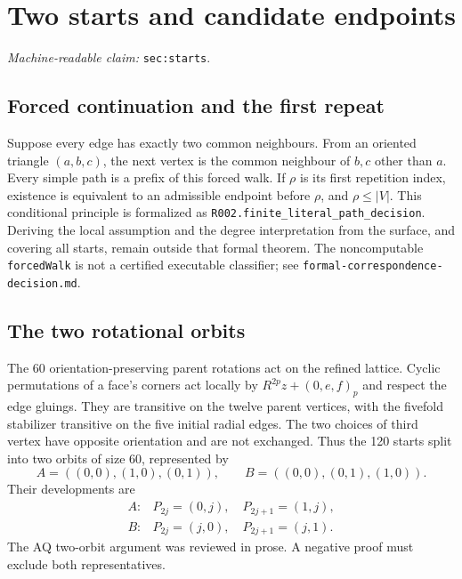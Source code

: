 \documentclass[11pt]{amsart}
\newcommand{\record}[1]{\nolinkurl{#1}}
\newcommand{\claimid}[1]{\par\nopagebreak\noindent\textit{Machine-readable claim:} \record{#1}.\par}
\begin{document}
\section{Two starts and candidate endpoints}\label{sec:starts}
\claimid{sec:starts}
\subsection{Forced continuation and the first repeat}
Suppose every edge has exactly two common neighbours. From an oriented
triangle $(a,b,c)$, the next vertex is the common neighbour of $b,c$
other than $a$. Every simple path is a prefix of this forced walk. If
$\rho$ is its first repetition index, existence is equivalent to an
admissible endpoint before $\rho$, and $\rho\le |V|$. This conditional
principle is formalized as \record{R002.finite_literal_path_decision}.
Deriving the local assumption and the degree interpretation from the
surface, and covering all starts, remain outside that formal theorem.
The noncomputable \record{forcedWalk} is not a certified executable
classifier; see \record{formal-correspondence-decision.md}.

\subsection{The two rotational orbits}
The 60 orientation-preserving parent rotations act on the refined
lattice. Cyclic permutations of a face's corners act locally by
$R^{2p}z+(0,e,f)_p$ and respect the edge gluings. They are transitive
on the twelve parent vertices, with the fivefold stabilizer transitive
on the five initial radial edges. The two choices of third vertex have
opposite orientation and are not exchanged. Thus the 120 starts split
into two orbits of size 60, represented by
\[
 A=((0,0),(1,0),(0,1)),\qquad B=((0,0),(0,1),(1,0)).
\]
Their developments are
\begin{equation}\label{eq:3}
\begin{array}{ll}
 A: & P_{2j}=(0,j),\quad P_{2j+1}=(1,j),\\
 B: & P_{2j}=(j,0),\quad P_{2j+1}=(j,1).
\end{array}\tag{3}
\end{equation}
The AQ two-orbit argument was reviewed in prose. A negative proof must
exclude both representatives.
\end{document}
